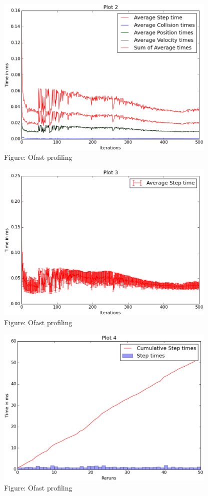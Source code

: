 \documentclass[english, 11pt]{article}
\begin{document}
\begin{figure}
	\begin{center}
		\includegraphics[width=400px]{ofast2}
	\end{center}
	\caption{Figure: Ofast profiling}
\end{figure}

\begin{figure}
	\begin{center}
		\includegraphics[width=400px]{ofast3}
	\end{center}
	\caption{Figure: Ofast profiling}
\end{figure}

\begin{figure}
	\begin{center}
		\includegraphics[width=400px]{ofast4}
	\end{center}
	\caption{Figure: Ofast profiling}
\end{figure}
\end{document}

